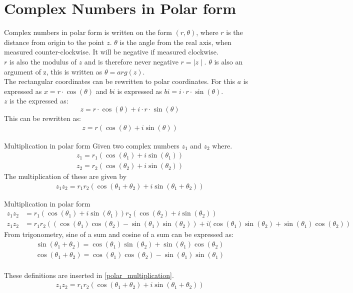 \section{Complex Numbers in Polar form}
Complex numbers in polar form is written on the form $(r,\theta)$, where $r$ is the distance from origin to the point $z$. $\theta$ is the angle from the real axis, when measured counter-clockwise. It will be negative if measured clockwise. \\
$r$ is also the modulus of $z$ and is therefore never negative $r=\mid z\mid$. $\theta$ is also an argument of z, this is written as $\theta=arg(z)$. %
\\ 
The rectangular coordinates can be rewritten to polar coordinates. For this $a$ is expressed as $x=r\cdot \cos(\theta)$ and $bi$ is expressed as $bi=i\cdot r\cdot \sin(\theta)$. \\
$z$ is the expressed as:
$$z=r\cdot \cos(\theta) + i\cdot r\cdot \sin(\theta)$$
This can be rewritten as:
\begin{align*}
z=r(\cos(\theta)+i \sin(\theta))
\end{align*}
\begin{theorem}{Multiplication in polar form}{}
Given two complex numbers $z_1$ and $z_2$ where.
\begin{align*}
z_1=r_1(\cos(\theta_1)+i\sin(\theta_1)) 
\\
z_2=r_2(\cos(\theta_2)+i\sin(\theta_2))
\end{align*}
The multiplication of these are given by
\begin{align*}
z_1 z_2=r_1r_2\left( \cos(\theta_1+\theta_2)+ i \sin(\theta_1+\theta_2)\right)
\end{align*}
\end{theorem}
\begin{prof}{Multiplication in polar form}{}
\begin{align}
z_1 z_2&=r_1( \cos(\theta_1)+ i \sin(\theta_1))r_2( \cos(\theta_2)+ i \sin(\theta_2)) \nonumber
\\
\label{polar_multiplication}
z_1z_2&=r_1r_2\left( (\cos(\theta_1)\cos(\theta_2)-\sin(\theta_1) \sin(\theta_2))+i(\cos(\theta_1)\sin(\theta_2)+\sin(\theta_1)\cos(\theta_2)\right)
\end{align}
From trigonometry, sine of a sum and cosine of a sum can be expressed as:
\\
\begin{align} \label{sum_cos_sin}
\sin(\theta_1+\theta_2)=\cos(\theta_1)\sin(\theta_2)+\sin(\theta_1)\cos(\theta_2)
\end{align}
\begin{align*}
\cos(\theta_1+\theta_2)=\cos(\theta_1)\cos(\theta_2)-\sin(\theta_1)\sin(\theta_1)
\end{align*}
\\
These definitions are inserted in \eqref{polar_multiplication}.
\\
\begin{align*}
z_1 z_2=r_1r_2\left( \cos(\theta_1+\theta_2)+ i \sin(\theta_1+\theta_2)\right)
\end{align*}
\end{prof}
